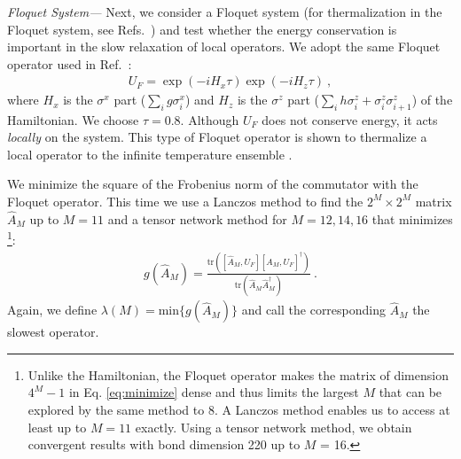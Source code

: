 \documentclass[twocolumn,superscriptaddress, prb]{revtex4-1}
\begin{document}
{\it Floquet System---}
Next, we consider a Floquet system (for thermalization in the Floquet system, see Refs.~) and test whether the energy conservation is important in the slow relaxation of local operators.
We adopt the same Floquet operator used in Ref.~:
\begin{align}
U_F = \exp(-i H_x \tau) \exp(-i H_z \tau) ~,
\label{eq:floquet_op}
\end{align}
where $H_x$ is the $\sigma^x$ part ($\sum_i g \sigma^x_i$) and $H_z$ is the $\sigma^z$ part ($\sum_i h \sigma^z_i +\sigma^z_i \sigma^z_{i+1}$)
of the Hamiltonian. We choose $\tau = 0.8$.
Although $U_F$ does not conserve energy, it acts {\it locally} on the system.
This type of Floquet operator is shown to thermalize a local operator to the infinite temperature ensemble \cite{Kim_ETH,Prosen:2002}.

We minimize the square of the Frobenius norm of the commutator with the Floquet operator.
This time we use a Lanczos method to find the $2^M \times 2^M$ matrix $\hat{A}_M$ up to $M = 11$ and a tensor network method for $M = 12, 14, 16$  
that minimizes \footnote{Unlike the Hamiltonian, the Floquet operator makes the matrix of dimension $4^M-1$ in Eq. \eqref{eq:minimize} dense and thus
limits the largest $M$ that can be explored by the same method to 8. A Lanczos method enables us to access at least up to $M = 11$ exactly. 
Using a tensor network method, we obtain convergent results with bond dimension 220 up to $M$ = 16.}:
\begin{align}\label{eq:floquet_minimize}
g(\hat{A}_M) = \frac{\mathrm{tr}([\hat{A}_M,U_F][\hat{A}_M,U_F]^\dag)}{\mathrm{tr}(\hat{A}_M\hat{A}_M^\dag)} ~.
\end{align}
Again, we define $\lambda(M) = \mathrm{min}\{g(\hat{A}_M)\}$ and
call the corresponding $\hat{A}_M$ the slowest operator.
\end{document}
